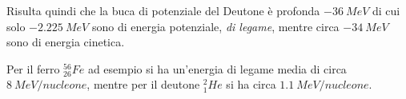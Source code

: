 Risulta quindi che la buca di potenziale del Deutone è profonda $\SI{-36}{MeV}$ di cui solo $\SI{-2.225}{MeV}$ sono di energia potenziale, \emph{di legame}, mentre circa $\SI{-34}{MeV}$ sono di energia cinetica.

Per il ferro $^{56}_{26}Fe$ ad esempio si ha un'energia di legame media di circa $\SI{8}{MeV / nucleone}$, mentre
per il deutone $^{2}_{1}He$ si ha circa $\SI{1.1}{MeV / nucleone}$.












